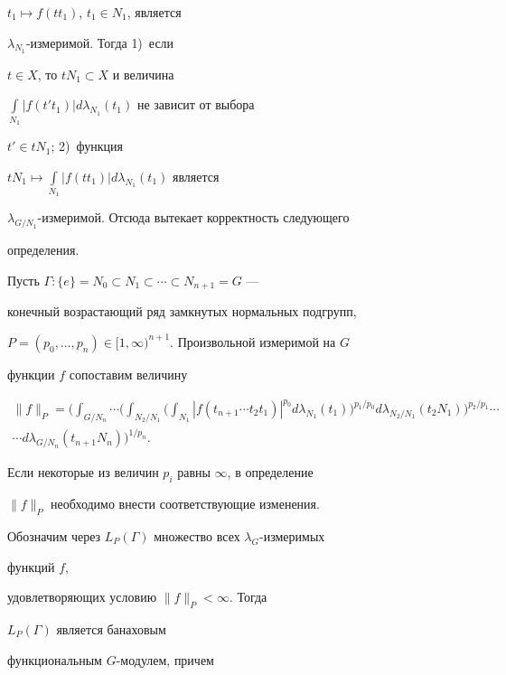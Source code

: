 $t_1\mapsto f(tt_1)$, $t_1\in N_1$, является


$\lambda_{N_1}$-измеримой. Тогда 1)~если


$t\in X$, то $tN_1\subset X$ и величина


$\int\limits_{N_1}|f(t't_1)|d\lambda_{N_1}(t_1)$ не зависит от выбора


$t'\in tN_1$; 2)~функция


$tN_1\mapsto\int\limits_{N_1}|f(tt_1)|d\lambda_{N_1}(t_1)$ является


$\lambda_{G/N_1}$-измеримой. Отсюда вытекает корректность следующего


определения.





Пусть $\Gamma:\{e\}=N_0\subset N_1\subset\dotsb\subset N_{n+1}=G$ ---


конечный возрастающий ряд замкнутых нормальных подгрупп,


$P=(p_0,\dotsc,p_n)\in[1,\infty)^{n+1}$. Произвольной измеримой на $G$


функции $f$ сопоставим величину


\begin{multline*}


\|f\|_P=\biggl(\int_{G/N_n}\dotsi\biggl(


\int_{N_2/N_1}\biggl(\int_{N_1}


|f(t_{n+1}\dotsb t_2t_1)|^{p_0}d\lambda_{N_1}(t_1)


\biggr)^{p_1/p_0}d\lambda_{N_2/N_1}(t_2N_1)\biggr)^{p_2/p_1}


\dotsb\\


\dotsb d\lambda_{G/N_n}(t_{n+1}N_n)\biggr)^{1/p_n}.


\end{multline*}


Если некоторые из величин $p_i$ равны $\infty$, в определение


$\|f\|_P$ необходимо внести соответствующие изменения.





Обозначим через $L_P(\Gamma)$ множество всех $\lambda_G$-измеримых


функций $f$,


удовлетворяющих условию $\|f\|_P<\infty$. Тогда


$L_P(\Gamma)$ является банаховым


функциональным $G$-модулем, причем


